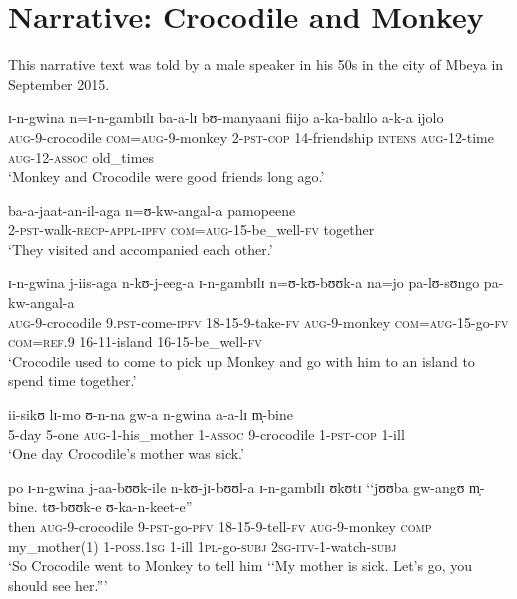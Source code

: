 \section{Narrative: Crocodile and Monkey}
\label{AppendixCrocodileMonkey}
This narrative text was told by a male speaker in his 50s in the city of Mbeya in September 2015.

\begin{exe}

\ex \gll ɪ-n-gwina n=ɪ-n-gambɪlɪ ba-a-lɪ bʊ-manyaani fiijo a-ka-balɪlo a-k-a ijolo\\
\textsc{aug}-9-crocodile \textsc{com}=\textsc{aug}-9-monkey 2-\textsc{pst}-\textsc{cop} 14-friendship \textsc{intens} \textsc{aug}-12-time \textsc{aug}-12-\textsc{assoc} old\_times\\
\glt \lq Monkey and Crocodile were good friends long ago.'

\ex \gll ba-a-jaat-an-il-aga n=ʊ-kw-angal-a pamopeene\\
2-\textsc{pst}-walk-\textsc{recp}-\textsc{appl}-\textsc{ipfv} \textsc{com}=\textsc{aug}-15-be\_well-\textsc{fv} together\\
\glt \lq They visited and accompanied each other.'

\ex \gll ɪ-n-gwina j-iis-aga n-kʊ-j-eeg-a ɪ-n-gambɪlɪ n=ʊ-kʊ-bʊʊk-a na=jo pa-lʊ-sʊngo pa-kw-angal-a\\
\textsc{aug}-9-crocodile 9.\textsc{pst}-come-\textsc{ipfv} 18-15-9-take-\textsc{fv} \textsc{aug}-9-monkey \textsc{com}=\textsc{aug}-15-go-\textsc{fv} \textsc{com}=\textsc{ref.9} 16-11-island 16-15-be\_well-\textsc{fv}\\
\glt \lq Crocodile used to come to pick up Monkey and go with him to an island to spend time together.'

\ex \gll ii-sikʊ lɪ-mo ʊ-n-na gw-a n-gwina a-a-lɪ m̩-bine\\
5-day 5-one \textsc{aug}-1-his\_mother 1-\textsc{assoc} 9-crocodile 1-\textsc{pst}-\textsc{cop} 1-ill\\
\glt \lq One day Crocodile's mother was sick.'

\ex \gll po ɪ-n-gwina j-aa-bʊʊk-ile n-kʊ-jɪ-bʊʊl-a ɪ-n-gambɪlɪ ʊkʊtɪ \lq\lq jʊʊba gw-angʊ m̩-bine. tʊ-bʊʊk-e ʊ-ka-n-keet-e''\\
then \textsc{aug}-9-crocodile 9-\textsc{pst}-go-\textsc{pfv} 18-15-9-tell-\textsc{fv} \textsc{aug}-9-monkey \textsc{comp} \phantom{\lq\lq}my\_mother(1) 1-\textsc{poss.1sg} 1-ill \textsc{1pl}-go-\textsc{subj} \textsc{2sg}-\textsc{itv}-1-watch-\textsc{subj}\\
\glt \lq So Crocodile went to Monkey to tell him \lq\lq My mother is sick. Let's go, you should see her.''{}'


\end{exe}
